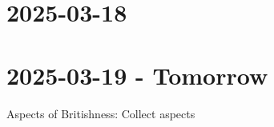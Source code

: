 \section{2025-03-18}

\section{2025-03-19 - Tomorrow}

Aspects of Britishness: Collect aspects
\startitemize[packed]
\item 
\stopitemize
